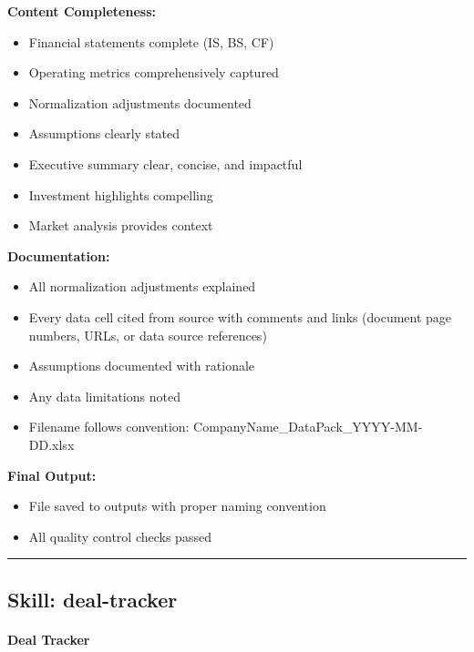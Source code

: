 \documentclass[11pt]{article}
\begin{document}
\textbf{Content Completeness:}

\begin{itemize}[leftmargin=*,itemsep=2pt,topsep=2pt]
\item {} Financial statements complete (IS, BS, CF)
\item {} Operating metrics comprehensively captured
\item {} Normalization adjustments documented
\item {} Assumptions clearly stated
\item {} Executive summary clear, concise, and impactful
\item {} Investment highlights compelling
\item {} Market analysis provides context
\end{itemize}

\textbf{Documentation:}

\begin{itemize}[leftmargin=*,itemsep=2pt,topsep=2pt]
\item {} All normalization adjustments explained
\item {} Every data cell cited from source with comments and links (document page numbers, URLs, or data source references)
\item {} Assumptions documented with rationale
\item {} Any data limitations noted
\item {} Filename follows convention: CompanyName\_\allowbreak{}DataPack\_\allowbreak{}YYYY-MM-DD.xlsx
\end{itemize}

\textbf{Final Output:}

\begin{itemize}[leftmargin=*,itemsep=2pt,topsep=2pt]
\item {} File saved to outputs with proper naming convention
\item {} All quality control checks passed
\end{itemize}

\vspace{0.8em}\hrule\vspace{0.8em}

\subsection{Skill: deal-tracker}\label{file:skills-deal-tracker-SKILL.md}

\paragraph{Deal Tracker}\mbox{}\par
\end{document}
